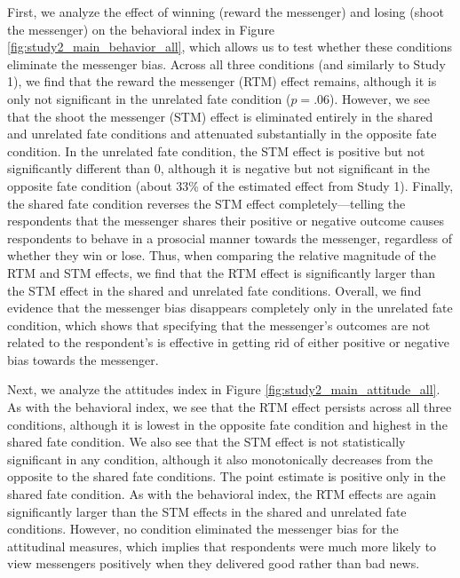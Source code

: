 

First, we analyze the effect of winning (reward the messenger) and
losing (shoot the messenger) on the behavioral index in Figure \ref{fig:study2_main_behavior_all}, which allows us to
test whether these conditions eliminate the messenger bias. Across all
three conditions (and similarly to Study 1), we find that the
reward the messenger (RTM) effect remains, although it is only not
significant in the unrelated fate condition ($p = .06$). However, we
see that the shoot the messenger (STM) effect is eliminated entirely in
the shared and unrelated fate conditions and attenuated substantially in
the opposite fate condition. In the unrelated fate condition, the STM
effect is positive but not significantly different than 0, although it
is negative but not significant in the opposite fate condition (about
33\% of the estimated effect from Study 1). Finally, the shared
fate condition reverses the STM effect completely---telling the
respondents that the messenger shares their positive or negative outcome
causes respondents to behave in a prosocial manner towards the
messenger, regardless of whether they win or lose. Thus, when comparing
the relative magnitude of the RTM and STM effects, we find that the RTM
effect is significantly larger than the STM effect in the shared and unrelated fate conditions.
Overall, we find evidence that the messenger bias disappears completely
only in the unrelated fate condition, which shows that specifying that
the messenger's outcomes are not related to the respondent's is
effective in getting rid of either positive or negative bias towards the
messenger.



Next, we analyze the attitudes index in Figure \ref{fig:study2_main_attitude_all}. As with the behavioral index, we
see that the RTM effect persists across all three conditions, although
it is lowest in the opposite fate condition and highest in the shared
fate condition. We also see that the STM effect is not statistically
significant in any condition, although it also monotonically decreases
from the opposite to the shared fate conditions. The point estimate is
positive only in the shared fate condition. As with the behavioral
index, the RTM effects are again significantly larger than the STM
effects in the shared and unrelated fate conditions. However, no condition eliminated the
messenger bias for the attitudinal measures, which implies that
respondents were much more likely to view messengers positively when
they delivered good rather than bad news.

